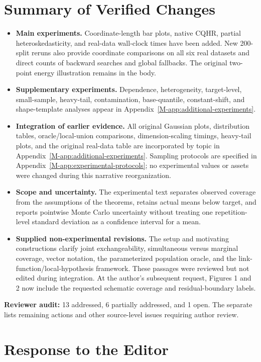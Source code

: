 \documentclass[11pt]{article}
\newcommand{\msapp}[1]{Appendix~\ref*{M-#1}}
\begin{document}
\section*{Summary of Verified Changes}
\begin{itemize}
\item \textbf{Main experiments.} Coordinate-length bar plots, native CQHR,
partial heteroskedasticity, and real-data wall-clock times have been added.
New 200-split reruns also provide coordinate comparisons on all six real
datasets and direct counts of backward searches and global fallbacks.
The original two-point energy illustration remains in the body.
\item \textbf{Supplementary experiments.} Dependence, heterogeneity, target-level,
small-sample, heavy-tail, contamination, base-quantile, constant-shift, and
shape-template analyses appear in \msapp{app:additional-experiments}.
\item \textbf{Integration of earlier evidence.} All original Gaussian plots,
distribution tables, oracle/local-union comparisons, dimension-scaling timings,
heavy-tail plots, and the original real-data table are incorporated by topic in
\msapp{app:additional-experiments}. Sampling protocols are specified in
\msapp{app:experimental-protocols}; no experimental values or assets were
changed during this narrative reorganization.
\item \textbf{Scope and uncertainty.} The experimental text separates observed
coverage from the assumptions of the theorems, retains actual means below
target, and reports pointwise Monte Carlo uncertainty without treating one
repetition-level standard deviation as a confidence interval for a mean.
\item \textbf{Supplied non-experimental revisions.} The setup and motivating
constructions clarify joint exchangeability, simultaneous versus marginal
coverage, vector notation, the parameterized population oracle, and the
link-function/local-hypothesis framework. These passages were reviewed but
not edited during integration. At the author's subsequent request, Figures 1
and 2 now include the requested schematic coverage and residual-boundary labels.
\end{itemize}
\textbf{Reviewer audit:} 13 addressed, 6 partially addressed, and 1 open.
The separate  lists remaining
actions and other source-level issues requiring author review.

\clearpage
\section*{Response to the Editor}
\end{document}
